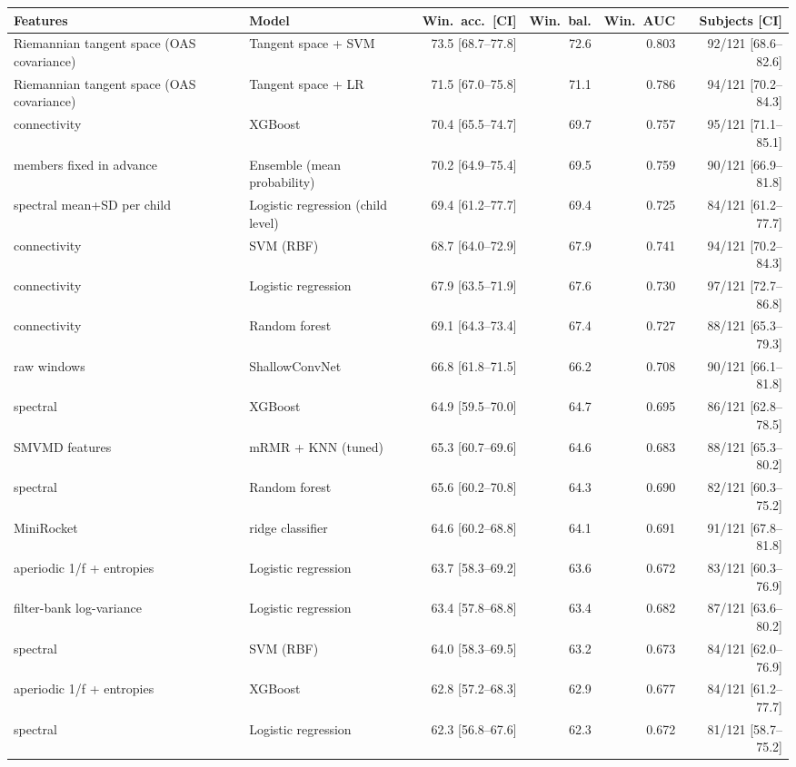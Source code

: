 \scriptsize
\begin{tabular}{llrrrr}
\hline
Features & Model & Win.\ acc.\ [CI] & Win.\ bal. & Win.\ AUC & Subjects [CI] \\
\hline
Riemannian tangent space (OAS covariance) & Tangent space + SVM & 73.5 [68.7--77.8] & 72.6 & 0.803 & 92/121 [68.6--82.6] \\
Riemannian tangent space (OAS covariance) & Tangent space + LR & 71.5 [67.0--75.8] & 71.1 & 0.786 & 94/121 [70.2--84.3] \\
connectivity & XGBoost & 70.4 [65.5--74.7] & 69.7 & 0.757 & 95/121 [71.1--85.1] \\
members fixed in advance & Ensemble (mean probability) & 70.2 [64.9--75.4] & 69.5 & 0.759 & 90/121 [66.9--81.8] \\
spectral mean+SD per child & Logistic regression (child level) & 69.4 [61.2--77.7] & 69.4 & 0.725 & 84/121 [61.2--77.7] \\
connectivity & SVM (RBF) & 68.7 [64.0--72.9] & 67.9 & 0.741 & 94/121 [70.2--84.3] \\
connectivity & Logistic regression & 67.9 [63.5--71.9] & 67.6 & 0.730 & 97/121 [72.7--86.8] \\
connectivity & Random forest & 69.1 [64.3--73.4] & 67.4 & 0.727 & 88/121 [65.3--79.3] \\
raw windows & ShallowConvNet & 66.8 [61.8--71.5] & 66.2 & 0.708 & 90/121 [66.1--81.8] \\
spectral & XGBoost & 64.9 [59.5--70.0] & 64.7 & 0.695 & 86/121 [62.8--78.5] \\
SMVMD features & mRMR + KNN (tuned) & 65.3 [60.7--69.6] & 64.6 & 0.683 & 88/121 [65.3--80.2] \\
spectral & Random forest & 65.6 [60.2--70.8] & 64.3 & 0.690 & 82/121 [60.3--75.2] \\
MiniRocket & ridge classifier & 64.6 [60.2--68.8] & 64.1 & 0.691 & 91/121 [67.8--81.8] \\
aperiodic 1/f + entropies & Logistic regression & 63.7 [58.3--69.2] & 63.6 & 0.672 & 83/121 [60.3--76.9] \\
filter-bank log-variance & Logistic regression & 63.4 [57.8--68.8] & 63.4 & 0.682 & 87/121 [63.6--80.2] \\
spectral & SVM (RBF) & 64.0 [58.3--69.5] & 63.2 & 0.673 & 84/121 [62.0--76.9] \\
aperiodic 1/f + entropies & XGBoost & 62.8 [57.2--68.3] & 62.9 & 0.677 & 84/121 [61.2--77.7] \\
spectral & Logistic regression & 62.3 [56.8--67.6] & 62.3 & 0.672 & 81/121 [58.7--75.2] \\

\end{tabular}

